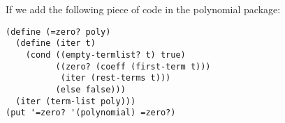 \documentclass[a4paper,12pt]{article}
\begin{document}
If we add the following piece of code in the polynomial package:
\begin{lstlisting}
(define (=zero? poly)
  (define (iter t)
    (cond ((empty-termlist? t) true)
          ((zero? (coeff (first-term t)))
           (iter (rest-terms t)))
          (else false)))
  (iter (term-list poly)))
(put '=zero? '(polynomial) =zero?)
\end{lstlisting}
\end{document}
